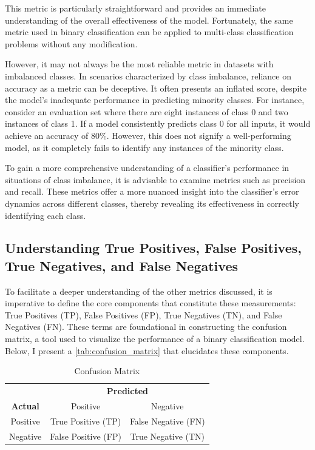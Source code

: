 This metric is particularly straightforward and provides an immediate understanding of the overall effectiveness of the model. Fortunately, the same metric used in binary classification can be applied to multi-class classification problems without any modification.

However, it may not always be the most reliable metric in datasets with imbalanced classes. In scenarios characterized by class imbalance, reliance on accuracy as a metric can be deceptive. It often presents an inflated score, despite the model's inadequate performance in predicting minority classes. For instance, consider an evaluation set where there are eight instances of class 0 and two instances of class 1. If a model consistently predicts class 0 for all inputs, it would achieve an accuracy of $80\%$. However, this does not signify a well-performing model, as it completely fails to identify any instances of the minority class.

To gain a more comprehensive understanding of a classifier's performance in situations of class imbalance, it is advisable to examine metrics such as precision and recall. These metrics offer a more nuanced insight into the classifier's error dynamics across different classes, thereby revealing its effectiveness in correctly identifying each class.

\subsection{Understanding True Positives, False Positives, True Negatives, and False Negatives}

To facilitate a deeper understanding of the other metrics discussed, it is imperative to define the core components that constitute these measurements: True Positives (TP), False Positives (FP), True Negatives (TN), and False Negatives (FN). These terms are foundational in constructing the confusion matrix, a tool used to visualize the performance of a binary classification model. Below, I present a \autoref{tab:confusion_matrix} that elucidates these components.

\begin{table}[h]
    \centering
    \caption{Confusion Matrix}
    \begin{tabular}{|c|c|c|}
        \hline
                                          & \multicolumn{2}{c|}{\textbf{Predicted}}                       \\ \cline{2-3}
        \multirow{-2}{*}{\textbf{Actual}} & Positive                                & Negative            \\
        \hline
        Positive                          & True Positive (TP)                      & False Negative (FN) \\
        \hline
        Negative                          & False Positive (FP)                     & True Negative (TN)  \\
        \hline
    \end{tabular}

    \label{tab:confusion_matrix}
\end{table}


